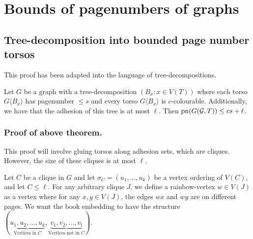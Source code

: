 \section{Bounds of pagenumbers of graphs}\label{sec:BoundedPagenumber} 
\subsection{Tree-decomposition into bounded page number torsos}\label{ssec:Clique_sum_Pagenumber_bound}

This proof has been adapted into the language of tree-decompositions. 
\begin{theorem}\label{thm:clique_sum_pagenumber_bound}
	Let \(G\) be a graph with a tree-decomposition \((B_x: x \in V(T))\) where each torso \(G \langle B_x \rangle\) has pagenumber \(\leq s\) and every torso \(G \langle B_x \rangle\) is \(c\)-colourable. Additionally, we have that the adhesion of this tree is at most \(\ell\).
	Then \(\text{pn}(G(\mathcal{G}, T)) \leq cs + \ell\).  
\end{theorem}

\subsubsection{Proof of above theorem.}
This proof will involve gluing torsos along adhesion sets, which are cliques. However, the size of these cliques is at most \(\ell\). 

Let \(C\) be a clique in \(G\) and let \(\sigma_C = (u_1, ... , u_k)\) be a vertex ordering of \(V(C)\), and let \(C \leq \ell\). For any arbitrary clique \(J\), we define a rainbow-vertex \(w \in V(J)\) as a vertex where for any \(x, y \in V(J)\), the edges \(wx\) and \(wy\) are on different pages. We want the book embedding to have the structure \((\underbrace{u_1, u_2, ..., u_k}_{\text{Vertices in } C}, \underbrace{v_1, v_2, ..., v_l}_{\text{Vertices not in }C})\). 

